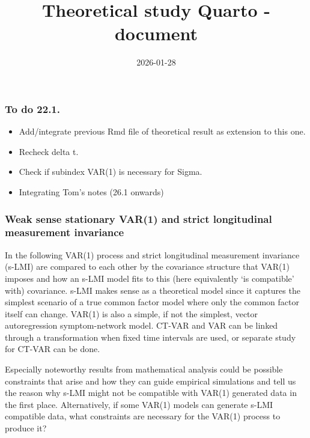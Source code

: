 \documentclass[
  letterpaper,
  DIV=11,
  numbers=noendperiod]{scrartcl}
\title{Theoretical study Quarto -document}
\author{}
\date{2026-01-28}
\begin{document}
\maketitle
\ifdefined\Shaded\renewenvironment{Shaded}{\begin{tcolorbox}[boxrule=0pt, sharp corners, interior hidden, borderline west={3pt}{0pt}{shadecolor}, enhanced, frame hidden, breakable]}{\end{tcolorbox}}\fi

\hypertarget{to-do-22.1.}{%
\subsubsection{To do 22.1.}\label{to-do-22.1.}}

\begin{itemize}
\item
  Add/integrate previous Rmd file of theoretical result as extension to
  this one.
\item
  Recheck delta t.
\item
  Check if subindex VAR(1) is necessary for Sigma.
\item
  Integrating Tom's notes (26.1 onwards)
\end{itemize}

\hypertarget{weak-sense-stationary-var1-and-strict-longitudinal-measurement-invariance}{%
\subsubsection{Weak sense stationary VAR(1) and strict longitudinal
measurement
invariance}\label{weak-sense-stationary-var1-and-strict-longitudinal-measurement-invariance}}

In the following VAR(1) process and strict longitudinal measurement
invariance (s-LMI) are compared to each other by the covariance
structure that VAR(1) imposes and how an s-LMI model fits to this (here
equivalently `is compatible' with) covariance. s-LMI makes sense as a
theoretical model since it captures the simplest scenario of a true
common factor model where only the common factor itself can change.
VAR(1) is also a simple, if not the simplest, vector autoregression
symptom-network model. CT-VAR and VAR can be linked through a
transformation when fixed time intervals are used, or separate study for
CT-VAR can be done.

Especially noteworthy results from mathematical analysis could be
possible constraints that arise and how they can guide empirical
simulations and tell us the reason why s-LMI might not be compatible
with VAR(1) generated data in the first place. Alternatively, if some
VAR(1) models can generate s-LMI compatible data, what constraints are
necessary for the VAR(1) process to produce it?
\end{document}
